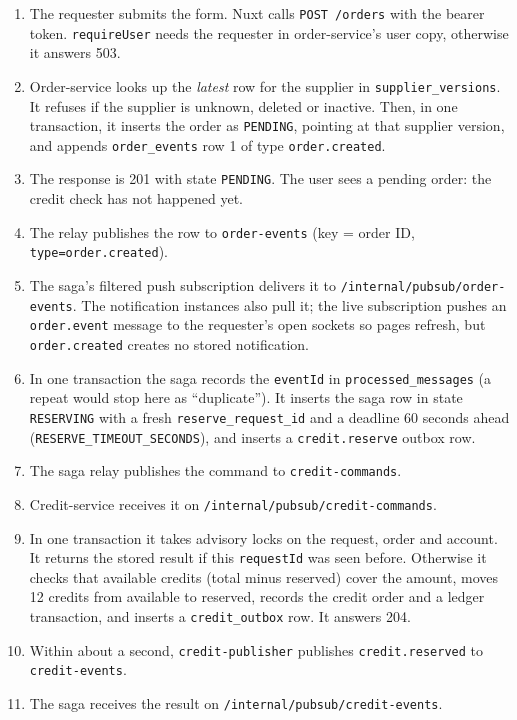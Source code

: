 \documentclass[11pt,a4paper]{article}
\newcommand{\code}[1]{\nolinkurl{#1}}
\begin{document}
\begin{enumerate}
  \item The requester submits the form. Nuxt calls \code{POST /orders} with the bearer
  token. \code{requireUser} needs the requester in order-service's user copy, otherwise
  it answers 503.
  \item Order-service looks up the \emph{latest} row for the supplier in
  \code{supplier_versions}. It refuses if the supplier is unknown, deleted or inactive.
  Then, in one transaction, it inserts the order as \code{PENDING}, pointing at that
  supplier version, and appends \code{order_events} row 1 of type \code{order.created}.
  \item The response is 201 with state \code{PENDING}. The user sees a pending order:
  the credit check has not happened yet.
  \item The relay publishes the row to \code{order-events} (key = order ID,
  \code{type=order.created}).
  \item The saga's filtered push subscription delivers it to
  \code{/internal/pubsub/order-events}. The notification instances also pull it; the
  live subscription pushes an \code{order.event} message to the requester's open sockets
  so pages refresh, but \code{order.created} creates no stored notification.
  \item In one transaction the saga records the \code{eventId} in
  \code{processed_messages} (a repeat would stop here as ``duplicate''). It inserts the
  saga row in state \code{RESERVING} with a fresh \code{reserve_request_id} and a deadline
  60 seconds ahead (\code{RESERVE_TIMEOUT_SECONDS}), and inserts a \code{credit.reserve}
  outbox row.
  \item The saga relay publishes the command to \code{credit-commands}.
  \item Credit-service receives it on \code{/internal/pubsub/credit-commands}.
  \item In one transaction it takes advisory locks on the request, order and account. It
  returns the stored result if this \code{requestId} was seen before. Otherwise it checks
  that available credits (total minus reserved) cover the amount, moves 12 credits from
  available to reserved, records the credit order and a ledger transaction, and inserts
  a \code{credit_outbox} row. It answers 204.
  \item Within about a second, \code{credit-publisher} publishes \code{credit.reserved}
  to \code{credit-events}.
  \item The saga receives the result on \code{/internal/pubsub/credit-events}.

\end{enumerate}
\end{document}
